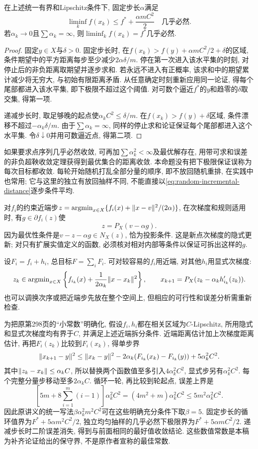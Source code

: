 \begin{proposition}
在上述统一有界和Lipschitz条件下, 固定步长$\alpha$满足
\[
 \liminf_k f(x_k)\le f^*+\frac{\alpha mC^2}{2}\quad\text{几乎必然}.
\]
若$\alpha_k\to0$且$\sum\alpha_k=\infty$, 则$\liminf_k f(x_k)=f^*$几乎必然.
\end{proposition}
\begin{proof}
固定$y\in X$与$\delta>0$. 固定步长时, 在$f(x_k)>f(y)+\alpha mC^2/2+\delta$的区域, 条件期望中的平方距离每步至少减少$2\alpha\delta/m$. 停在第一次进入该水平集的时刻, 对停止后的非负距离取期望并逐步求和. 若永远不进入有正概率, 该求和中的期望累计减少将无穷大, 与初始有限距离矛盾. 从任意确定时刻重新应用同一论证, 得每个尾部都进入该水平集, 即下极限不超过这个阈值. 对可数个逼近$f^*$的$y$和趋零的$\delta$取交集, 得第一项.

递减步长时, 取足够晚的起点使$\alpha_k C^2\le\delta/m$. 在$f(x_k)>f(y)+\delta$区域, 条件漂移不超过$-\alpha_k\delta/m$. 由于$\sum\alpha_k=\infty$, 同样的停止求和论证保证每个尾部都进入这个水平集. 令$\delta\downarrow0$并用可数逼近点, 得第二项.
\end{proof}

如果要求点序列几乎必然收敛, 可再加$\sum\alpha_k^2<\infty$及最优解存在, 用带可求和误差的非负超鞅收敛定理获得到最优集合的距离收敛. 本命题没有把下极限保证误称为每次目标都收敛. 每轮开始随机打乱全部分量的顺序, 即不放回随机重排, 在实践中也常用; 它与这里的独立有放回抽样不同, 不能直接以\eqref{eq:random-incremental-distance}逐步条件平均.

对$f_i$的约束近端步$z=\operatorname{argmin}_{x\in X}\{f_i(x)+\lVert x-v\rVert^2/(2\alpha)\}$, 在次梯度和规则适用时, 有$g\in\partial f_i(z)$使
\[
 z=P_X(v-\alpha g).
\]
因为最优性条件是$v-z-\alpha g\in N_X(z)$, 恰为投影条件. 这是新点次梯度的隐式更新; 对只有扩展实值定义的函数, 必须核对相对内部等条件以保证可拆出这样的$g$.

设$F_i=f_i+h_i$, 总目标$F=\sum_iF_i$. 可对较容易的$f_i$用近端, 对其他$h_i$用显式次梯度:
\[
 z_k\in\operatorname{argmin}_{x\in X}\left\{f_{i_k}(x)+\frac1{2\alpha_k}\lVert x-x_k\rVert^2\right\},\qquad
 x_{k+1}=P_X(z_k-\alpha_k h'_{i_k}(z_k)).
\]
也可以调换次序或把近端步先放在整个空间上, 但相应的可行性和误差分析需重新检查.

为把原第298页的“小常数”明确化, 假设$f_i,h_i$都在相关区域为$C$-Lipschitz, 所用隐式和显式次梯度均有界于$C$, 并满足上述近端拆分条件. 近端距离估计加上次梯度距离估计, 再把$F_i(z_k)$比较到$F_i(x_k)$, 得单步界
\[
 \lVert x_{k+1}-y\rVert^2\le\lVert x_k-y\rVert^2
 -2\alpha_k(F_{i_k}(x_k)-F_{i_k}(y))+5\alpha_k^2C^2.
\]
其中$\lVert z_k-x_k\rVert\le\alpha_k C$, 所以替换两个函数值至多引入$4\alpha_k^2C^2$, 显式步另有$\alpha_k^2C^2$. 每个完整分量步移动至多$2\alpha_k C$. 循环一轮, 再比较到轮起点, 误差上界是
\[
 [5m+8\sum_{i=1}^m(i-1)]\alpha_k^2C^2
 =(4m^2+m)\alpha_k^2C^2\le5m^2\alpha_k^2C^2.
\]
因此原讲义的统一写法$\beta\alpha_k^2m^2C^2$可在这些明确充分条件下取$\beta=5$. 固定步长的循环值界为$F^*+5\alpha m^2C^2/2$, 独立均匀抽样的几乎必然下极限界为$F^*+5\alpha mC^2/2$. 递减步长时二阶误差消失, 得到与前面相同的最好值收敛结论. 这些数值常数是本稿为补齐论证给出的保守界, 不是原作者宣称的最佳常数.

